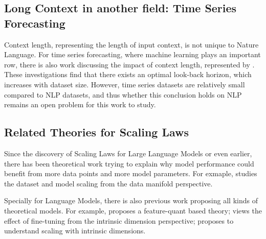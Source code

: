 \subsection{Long Context in another field: Time Series Forecasting}

Context length, representing the length of input context, is not unique to Nature Language. For time series forecasting, where machine learning plays an important row, there is also work discussing the impact of context length, represented by \cite{scalingtimeseries}. These investigations find that there exists an optimal look-back horizon, which increases with dataset size. However, time series datasets are relatively small compared to NLP datasets, and thus whether this conclusion holds on NLP remains an open problem for this work to study.

\subsection{Related Theories for Scaling Laws}

Since the discovery of Scaling Laws for Large Language Models \cite{openaiscaling} or even earlier, there has been theoretical work trying to explain why model performance could benefit from more data points and more model parameters. For exmaple, \cite{neuralscalingdatamanifold} studies the dataset and model scaling from the data manifold perspective.

Specially for Language Models, there is also previous work proposing all kinds of theoretical models. For example, \cite{michaud2024quantizationmodelneuralscaling} proposes a feature-quant based theory; \cite{aghajanyan2020intrinsicdimensionalityexplainseffectiveness} views the effect of fine-tuning from the intrinsic dimension perspective; \cite{havrilla2024understandintrinsicdim} proposes to understand scaling with intrinsic dimensions.